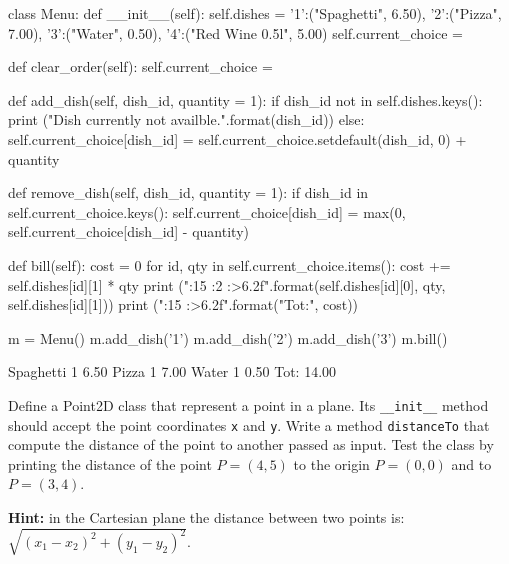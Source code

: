 \cprotEnv\begin{solution}
\begin{ipython}
class Menu:
    def __init__(self):
        self.dishes = {'1':("Spaghetti", 6.50), '2':("Pizza", 7.00), '3':("Water", 0.50),
                       '4':("Red Wine 0.5l", 5.00)}
        self.current_choice = {}
        
    def clear_order(self):
        self.current_choice = {}
        
    def add_dish(self, dish_id, quantity = 1):
        if dish_id not in self.dishes.keys():
            print ("Dish {} currently not availble.".format(dish_id))
        else:
            self.current_choice[dish_id] = 
                self.current_choice.setdefault(dish_id, 0) + quantity
            
    def remove_dish(self, dish_id, quantity = 1):
        if dish_id in self.current_choice.keys():
            self.current_choice[dish_id] = max(0, self.current_choice[dish_id] - quantity)
            
    def bill(self):
        cost = 0
        for id, qty in self.current_choice.items():
            cost += self.dishes[id][1] * qty
            print ("{:15} {:2} {:>6.2f}".format(self.dishes[id][0],
                                                qty,
                                                self.dishes[id][1]))
        print ("{:15}    {:>6.2f}".format("Tot:", cost))

m = Menu()
m.add_dish('1')
m.add_dish('2')
m.add_dish('3')
m.bill()
\end{ipython}
\begin{ioutput}
Spaghetti        1   6.50
Pizza            1   7.00
Water            1   0.50
Tot:                14.00
\end{ioutput}
\end{solution}

\begin{question}
Define a Point2D class that represent a point in a plane. Its \texttt{\_\_init\_\_} method should accept the point coordinates \texttt{x} and \texttt{y}. Write a method \texttt{distanceTo} that compute the distance of the point to another passed as input. Test the class by printing the distance of the point $P=(4, 5)$ to the origin $P=(0,0)$ and to $P=(3,4)$.

\noindent\textbf{Hint:} in the Cartesian plane the distance between two points is: $\sqrt{(x_1 - x_2)^2 + (y_1 - y_2)^2}$.
\end{question}

